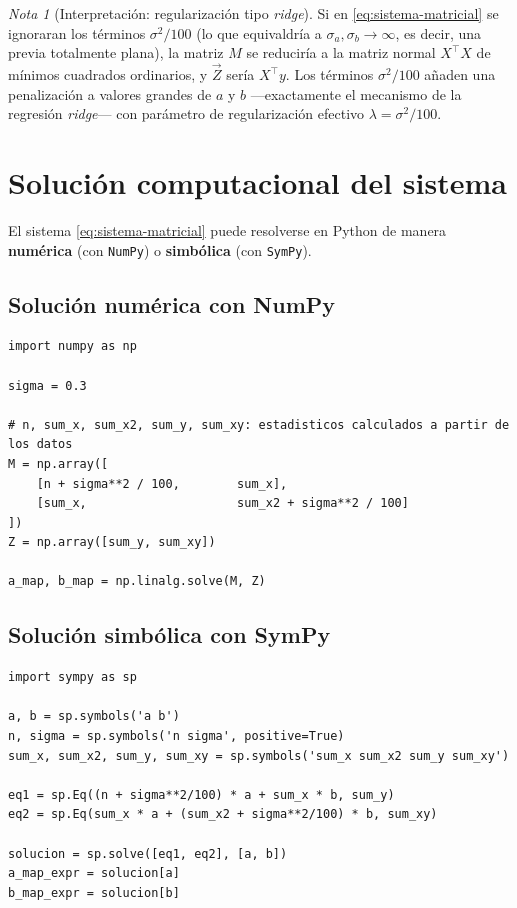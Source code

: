 \documentclass[11pt]{article}
\theoremstyle{remark}
\newtheorem*{nota}{Nota}
\begin{document}
\begin{nota}[Interpretación: regularización tipo \emph{ridge}]
Si en \eqref{eq:sistema-matricial} se ignoraran los términos $\sigma^2/100$
(lo que equivaldría a $\sigma_a,\sigma_b\to\infty$, es decir, una previa
totalmente plana), la matriz $M$ se reduciría a la matriz normal $X^\top X$
de mínimos cuadrados ordinarios, y $\vec Z$ sería $X^\top y$. Los términos
$\sigma^2/100$ añaden una penalización a valores grandes de $a$ y $b$
—exactamente el mecanismo de la regresión \emph{ridge}— con parámetro de
regularización efectivo $\lambda=\sigma^2/100$.
\end{nota}

\section{Solución computacional del sistema}

El sistema \eqref{eq:sistema-matricial} puede resolverse en Python de manera
\textbf{numérica} (con \texttt{NumPy}) o \textbf{simbólica} (con
\texttt{SymPy}).

\subsection{Solución numérica con NumPy}

\begin{lstlisting}
import numpy as np

sigma = 0.3

# n, sum_x, sum_x2, sum_y, sum_xy: estadisticos calculados a partir de los datos
M = np.array([
    [n + sigma**2 / 100,        sum_x],
    [sum_x,                     sum_x2 + sigma**2 / 100]
])
Z = np.array([sum_y, sum_xy])

a_map, b_map = np.linalg.solve(M, Z)
\end{lstlisting}


\subsection{Solución simbólica con SymPy}

\begin{lstlisting}
import sympy as sp

a, b = sp.symbols('a b')
n, sigma = sp.symbols('n sigma', positive=True)
sum_x, sum_x2, sum_y, sum_xy = sp.symbols('sum_x sum_x2 sum_y sum_xy')

eq1 = sp.Eq((n + sigma**2/100) * a + sum_x * b, sum_y)
eq2 = sp.Eq(sum_x * a + (sum_x2 + sigma**2/100) * b, sum_xy)

solucion = sp.solve([eq1, eq2], [a, b])
a_map_expr = solucion[a]
b_map_expr = solucion[b]
\end{lstlisting}
\end{document}

